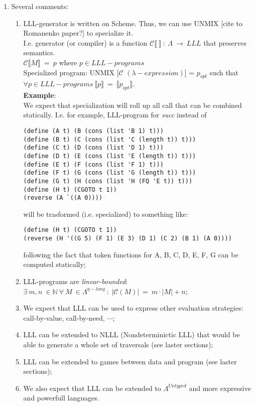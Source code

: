 \documentclass[a4paper, 10pt]{article}
\newcommand\abs[1]{\left|#1\right|}
\begin{document}
\begin{enumerate}
\item Several comments:
  \begin{enumerate}
  \item LLL-generator is written on Scheme. Thus, we can use UNMIX [cite to Romanenko paper?] to specialize it.\\
    I.e. generator (or compiler) is a function $\mathcal{C}\llbracket \ \rrbracket \ :\ \Lambda\ \rightarrow\ LLL$ that preserves semantics.\\
    $\mathcal{C}\llbracket M \rrbracket \ =\ p$ where $p \in LLL-programs$\\
    Specialized program: UNMIX [$\mathcal{C}$ $(\lambda -expression)$] = $p_{opt}$ such that\\
    $\forall p \in LLL-programs \ \llbracket p \rrbracket \ =\ \llbracket p_{opt} \rrbracket$.\\
    \textbf{Example}:\\
    We expect that specialization will roll up all call that can be combined statically. I.e. for example, LLL-program for \textit{succ} instead of
    \begin{verbatim}
(define (A t) (B (cons (list 'B 1) t)))
(define (B t) (C (cons (list 'C (length t)) t)))
(define (C t) (D (cons (list 'D 1) t)))
(define (D t) (E (cons (list 'E (length t)) t)))
(define (E t) (F (cons (list 'F 1) t)))
(define (F t) (G (cons (list 'G (length t)) t)))
(define (G t) (H (cons (list 'H (FQ 'E t)) t)))
(define (H t) (CGOTO t 1))
(reverse (A `((A 0))))
    \end{verbatim}
    will be trasformed (i.e. specialized) to something like:
    \begin{verbatim}
(define (H t) (CGOTO t 1))
(reverse (H '((G 5) (F 1) (E 3) (D 1) (C 2) (B 1) (A 0))))
    \end{verbatim}
    following the fact that token functions for A, B, C, D, E, F, G can be computed statically;
  \item LLL-programs are \textit{linear-bounded}: $\exists\ m,n\ \in \mathbb{N}\ \forall\ M\ \in \Lambda^{\eta-long}\ :\ \abs{\mathcal{C}(M)}\ =\ m\cdot\abs{M}+n$;
  \item We expect that LLL can be used to express other evaluation strategies: call-by-value, call-by-need, $\cdots$;
  \item LLL can be extended to NLLL (Nondeterminictic LLL) that would be able to generate a whole set of traversals (see laster sections);
  \item LLL can be extended to games between data and program (see laster sections);
  \item We also expect that LLL can be extended to $\Lambda^{Untyped}$ and more expressive and powerfull languages.
  \end{enumerate}
\end{enumerate}
\end{document}
